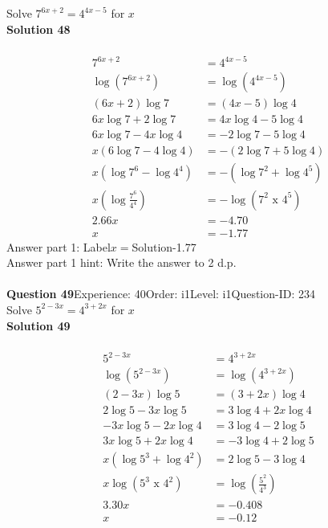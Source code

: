 \documentclass{article}
\begin{document}
Solve $7^{6x+2}=4^{4x-5}$ for $x$\\[4pt]
\noindent\textbf{Solution 48}\\[2pt]
\\[-35pt]\begin{align*}
7^{6x+2}&=4^{4x-5}\\[2pt]
\log(7^{6x+2})&=\log(4^{4x-5})\\[2pt]
(6x+2)\log7&=(4x-5)\log4\\[2pt]
6x\log7+2\log7&=4x\log4-5\log4\\[2pt]
6x\log7-4x\log4&=-2\log7-5\log4\\[2pt]
x(6\log7-4\log4)&=-(2\log7+5\log4)\\[2pt]
x(\log7^6-\log4^4)&=-(\log7^2+\log4^5)\\[2pt]
x\left(\log\displaystyle\frac{7^6}{4^4}\right)&=-\log(7^2 \,\, \text{x} \,\, 4^5)\\[2pt]
2.66x&=-4.70\\[2pt]
x&=-1.77
\end{align*}
Answer part 1: \hspace{10pt}Label\hspace{10pt}$x=$\hspace{10pt}Solution\hspace{10pt}-1.77\\
Answer part 1 hint: \hspace{15pt}Write the answer to 2 d.p.\\
\\[4pt]
\noindent\textbf{Question 49}\hspace{20pt}Experience: 40\hspace{20pt}Order: i1\hspace{20pt}Level: i1\hspace{20pt}Question-ID: 234\\[2pt]
Solve $5^{2-3x}=4^{3+2x}$ for $x$\\[4pt]
\noindent\textbf{Solution 49}\\[2pt]
\\[-35pt]\begin{align*}
5^{2-3x}&=4^{3+2x}\\[2pt]
\log(5^{2-3x})&=\log(4^{3+2x})\\[2pt]
(2-3x)\log5&=(3+2x)\log4\\[2pt]
2\log5-3x\log5&=3\log4+2x\log4\\[2pt]
-3x\log5-2x\log4&=3\log4-2\log5\\[2pt]
3x\log5+2x\log4&=-3\log4+2\log5\\[2pt]
x(\log5^3+\log4^2)&=2\log5-3\log4\\[2pt]
x\log{(5^3\,\,\text{x}\,\,4^2)}&=\log\left(\displaystyle\frac{5^2}{4^3}\right)\\[2pt]
3.30x&=-0.408\\[2pt]
x&=-0.12
\end{align*}
\end{document}
